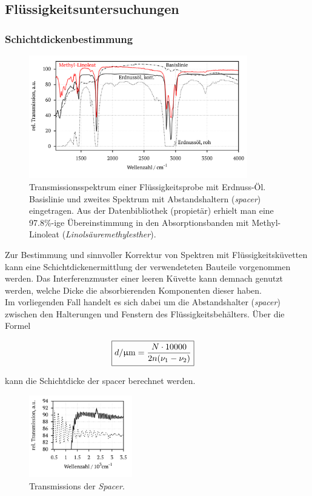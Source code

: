 \documentclass[a4paper,10pt,twocolumn]{article}
\newcommand{\ix}[1]{_\text{#1}}
\newcommand{\tilt}[1]{\textit{#1}}
\begin{document}
		\subsection{Fl\"ussigkeitsuntersuchungen}

		\subsubsection{Schichtdickenbestimmung}

			\begin{figure}
			\centering
				\includegraphics[width=0.85\textwidth]{Gruppe2A/erdnuss.pdf}
				\caption{Transmissionsspektrum einer Fl\"ussigkeitsprobe mit Erdnuss-\"Ol. Basislinie und zweites Spektrum mit Abstandshaltern (\tilt{spacer}) eingetragen. Aus der Datenbibliothek (propiet\"ar) erhielt man eine 97.8\%-ige \"Ubereinstimmung in den Absorptionsbanden mit Methyl-Linoleat (\tilt{Linols\"auremethylesther}).} 
				\label{img:erdnuss}
			\end{figure}

		Zur Bestimmung und sinnvoller Korrektur von Spektren mit Fl\"ussigkeitsk\"uvetten kann eine Schichtdickenermittlung der verwendeteten Bauteile vorgenommen werden. Das Interferenzmuster einer leeren K\"uvette kann demnach genutzt werden, welche Dicke die absorbierenden Komponenten dieser haben.\\
		Im vorliegenden Fall handelt es sich dabei um die Abstandshalter (\tilt{spacer}) zwischen den Halterungen und Fenstern des Fl\"ussigkeitsbeh\"alters. \"Uber die Formel
		
		\begin{align}
		\Aboxed{
			d/\unit{\upmu m}=\frac{N\cdot 10000}{2n(\nu\ix{1}-\nu\ix{2})}
			}
		\end{align}
		
		kann die Schichtdicke der spacer berechnet werden.

		\begin{figure}[h]
			\centering
			\includegraphics[width=0.4\textwidth]{Gruppe2A/spacer.pdf}
			\caption{Transmissions der \tilt{Spacer}.}
			\label{img:space}
		\end{figure}
		
\end{document}
